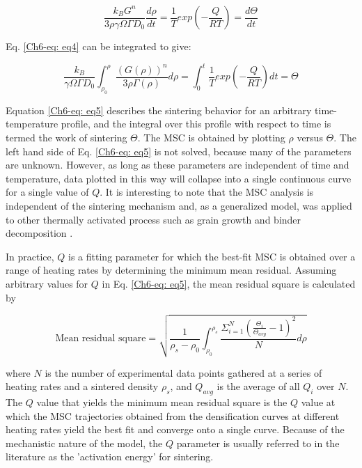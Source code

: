 \begin{equation}
\label{Ch6-eq: eq4}
\frac{k_{B} G^{n}}{3 \rho \gamma \Omega \Gamma D_{0}} \frac{d\rho}{dt} = \frac{1}{T} exp \left( -\frac{Q}{RT} \right) = \frac{d \Theta}{dt}
\end{equation}

\noindent Eq. \ref{Ch6-eq: eq4} can be integrated to give:

\begin{equation}
\label{Ch6-eq: eq5}
\frac{k_{B} }{ \gamma \Omega \Gamma D_{0}} \int_{\rho_{0}}^{\rho} \frac{(G(\rho))^{n}}{3 \rho \Gamma (\rho)} d \rho = \int_{0}^{t} \frac{1}{T} exp \left( -\frac{Q}{RT} \right) dt = \Theta
\end{equation}

\noindent Equation \ref{Ch6-eq: eq5} describes the sintering behavior for an arbitrary time-temperature profile, and the integral over this profile with respect to time is termed the work of sintering $\Theta$. The MSC is obtained by plotting $\rho$ versus $\Theta$. The left hand side of Eq. \ref{Ch6-eq: eq5} is not solved, because many of the parameters are unknown. However, as long as these parameters are independent of time and temperature, data plotted in this way will collapse into a single continuous curve for a single value of $Q$. It is interesting to note that the MSC analysis is independent of the sintering mechanism and, as a generalized model, was applied to other thermally activated process such as grain growth \cite{Park2006} and binder decomposition \cite{Diantonio2005,Aggarwal2007}.

In practice, $Q$ is a fitting parameter for which the best-fit MSC is obtained over a range of heating rates by determining the minimum mean residual. Assuming arbitrary values for $Q$ in Eq. \ref{Ch6-eq: eq5}, the mean residual square is calculated by \cite{Blaine2006}


\begin{equation}
\label{Ch6-eq: eq6}
\mbox{Mean residual square} = \sqrt{\frac{1}{\rho_{s}-\rho_{0}}\int_{\rho_{0}}^{\rho_{s}} \frac{\Sigma_{i=1}^{N} \left( \frac{\Theta_{i}}{\Theta_{avg}}-1 \right)^{2}}{N} d\rho}
\end{equation}

\noindent where $N$ is the number of experimental data points gathered at a series of heating rates and a sintered density $\rho_{s}$, and $Q_{avg}$ is the average of all $Q_{i}$ over $N$. The $Q$ value that yields the minimum mean residual square is the $Q$ value at which the MSC trajectories obtained from the densification curves at different heating rates yield the best fit and converge onto a single curve.  Because of the mechanistic nature of the model, the $Q$ parameter is usually referred to in the literature as the 'activation energy' for sintering.

